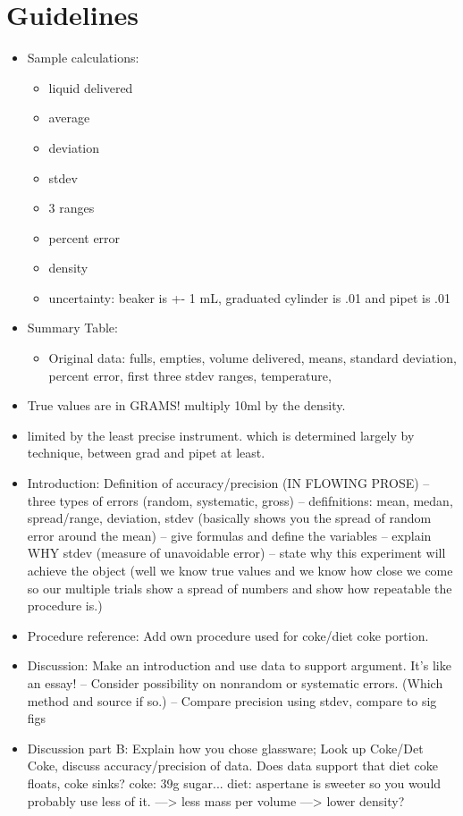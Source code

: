 \documentclass[fleqn,titlepage]{article}
\begin{document}
\section{Guidelines}
  \begin{itemize}
    \item Sample calculations:
      \begin{itemize}
        \item liquid delivered
        \item average
        \item deviation
        \item stdev
        \item 3 ranges
        \item percent error
        \item density
        \item uncertainty: beaker is +- 1 mL, graduated cylinder is .01 and pipet is .01
      \end{itemize}
    \item Summary Table:
      \begin{itemize}
        \item Original data: fulls, empties, volume delivered, means, standard deviation, percent error, first three stdev ranges, temperature, 
      \end{itemize}
    \item True values are in GRAMS! multiply 10ml by the density.
    \item limited by the least precise instrument. which is determined largely by technique, between grad and pipet at least.
    \item Introduction: Definition of accuracy/precision (IN FLOWING PROSE) -- three types of errors (random, systematic, gross) -- defifnitions: mean, medan, spread/range, deviation, stdev (basically shows you the spread of random error around the mean) -- give formulas and define the variables -- explain WHY stdev (measure of unavoidable error) -- state why this experiment will achieve the object (well we know true values and we know how close we come so our multiple trials show a spread of numbers and show how repeatable the procedure is.)
    \item Procedure reference: Add own procedure used for coke/diet coke portion. 
    \item Discussion: Make an introduction and use data to support argument. It's like an essay! -- Consider possibility on nonrandom or systematic errors. (Which method and source if so.) -- Compare precision using stdev, compare to sig figs
    \item Discussion part B: Explain how you chose glassware; Look up Coke/Det Coke, discuss accuracy/precision of data. Does data support that diet coke floats, coke sinks? coke: 39g sugar... diet: aspertane is sweeter so you would probably use less of it. ---> less mass per volume ---> lower density? 
  \end{itemize}
\end{document}
